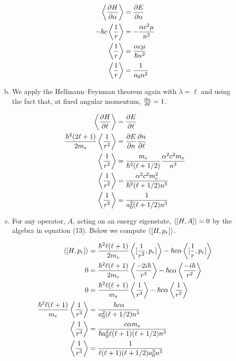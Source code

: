 \documentclass[]{article}
\begin{document}
\begin{enumerate}[1)]
\begin{enumerate}[a)]
\begin{equation}
\begin{split}
\expval{\pdv{H}{\alpha} } & = \pdv{E}{\alpha} \\
-\hbar c \expval{\frac{1}{r}} & = -\frac{\alpha c^2 \mu }{n^2} \\
\expval{\frac{1}{r}} & = \frac{\alpha c \mu }{\hbar n^2} \\
\expval{\frac{1}{r}} & = \frac{1 }{a_0 n^2}
\end{split}
\end{equation}

\item We apply the Hellmann–Feynman theorem again with $\lambda = \ell$ and using the fact that, at fixed angular momentum, $\pdv{n}{\ell} = 1$. 

\begin{equation}
\begin{split}
\expval{\pdv{H}{\ell} } & = \pdv{E}{\ell} \\
\frac{\hbar^2(2\ell +1)}{2m_e}\expval{ \frac{1}{r^2}  } & = \pdv{E}{n}\pdv{n}{\ell}  \\
\expval{ \frac{1}{r^2}  } & = \frac{m_e }{\hbar^2(\ell +1/2 )} \frac{  \alpha^2 c^2 m_e }{ n^3  } \\
\expval{ \frac{1}{r^2}  } & =\frac{  \alpha^2 c^2 m_e^2 }{ \hbar^2 (\ell +1/2 )n^3  } \\
\expval{ \frac{1}{r^2}  } & =\frac{ 1 }{ a_0^2 (\ell +1/2 )n^3  }
\end{split}
\end{equation}

\item For any operator, $A$, acting on an energy eigenstate, $\expval{[H , A]} = 0$ by the algebra in equation (13). Below we compute $\expval{[H , p_r]} $.

\begin{equation}
\begin{split}
\expval{[H , p_r]} & = \frac{\hbar^2 \ell(\ell +1)}{2m_e}\expval{ [ \frac{1}{r^2} ,  p_r] } - \hbar c \alpha \expval{  [ \frac{1}{r} , p_r  ]   }  \\
0  & = \frac{\hbar^2 \ell(\ell +1)}{2m_e}\expval{  \frac{-2i\hbar}{r^3} } - \hbar c \alpha \expval{  \frac{-i\hbar}{r^2}  }  \\
0  & = \frac{\hbar^2 \ell(\ell +1)}{m_e}\expval{  \frac{1}{r^3} } - \hbar c \alpha \expval{  \frac{1}{r^2}  }  \\
\frac{\hbar^2 \ell(\ell +1)}{m_e}\expval{  \frac{1}{r^3} } & =   \frac{ \hbar c \alpha }{ a_0^2 (\ell +1/2 )n^3  }    \\
\expval{  \frac{1}{r^3} } & =  \frac{ c \alpha m_e }{ \hbar a_0^2 \ell(\ell +1)(\ell +1/2 )n^3  }    \\
\expval{  \frac{1}{r^3} } & =  \frac{ 1 }{\ell(\ell +1)(\ell +1/2 )  a_0^3   n^3  }    \\
\end{split}
\end{equation}


\end{enumerate}
\end{enumerate}
\end{document}

